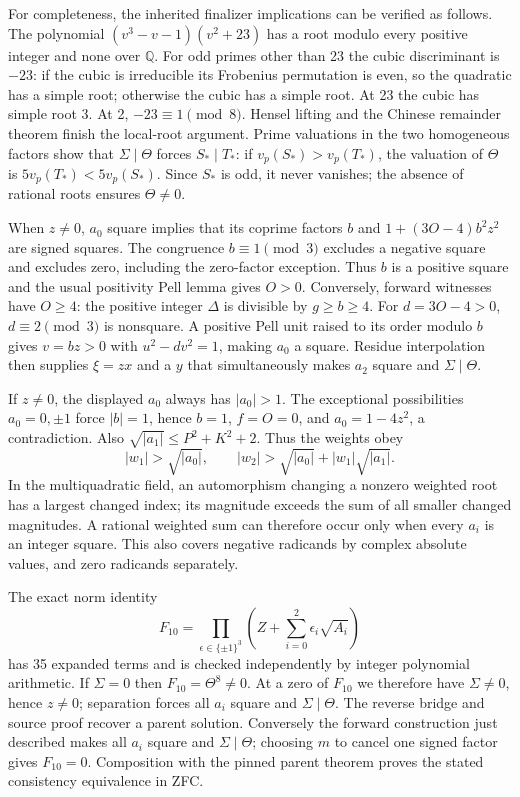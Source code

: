 For completeness, the inherited finalizer implications can be verified
as follows. The polynomial $(v^3-v-1)(v^2+23)$ has a root modulo every
positive integer and none over $\mathbb Q$. For odd primes other than
23 the cubic discriminant is $-23$: if the cubic is irreducible its
Frobenius permutation is even, so the quadratic has a simple root;
otherwise the cubic has a simple root. At 23 the cubic has simple root
3. At 2, $-23\equiv1\pmod8$. Hensel lifting and the Chinese remainder
theorem finish the local-root argument. Prime valuations in the two
homogeneous factors show that $\Sigma\mid\Theta$ forces $S_*\mid T_*$:
if $v_p(S_*)>v_p(T_*)$, the valuation of $\Theta$ is
$5v_p(T_*)<5v_p(S_*)$. Since $S_*$ is odd, it never vanishes; the absence
of rational roots ensures $\Theta\ne0$.

When $z\ne0$, $a_0$ square implies that its coprime factors $b$ and
$1+(3O-4)b^2z^2$ are signed squares. The congruence $b\equiv1\pmod3$
excludes a negative square and excludes zero, including the zero-factor
exception. Thus $b$ is a positive square and the usual positivity Pell
lemma gives $O>0$. Conversely, forward witnesses have $O\ge4$: the
positive integer $\Delta$ is divisible by $g\ge b\ge4$. For
$d=3O-4>0$, $d\equiv2\pmod3$ is nonsquare. A positive Pell unit raised
to its order modulo $b$ gives $v=bz>0$ with $u^2-dv^2=1$, making $a_0$
a square. Residue interpolation then supplies $\xi=zx$ and a $y$ that
simultaneously makes $a_2$ square and $\Sigma\mid\Theta$.

If $z\ne0$, the displayed $a_0$ always has $|a_0|>1$. The exceptional
possibilities $a_0=0,\pm1$ force $|b|=1$, hence $b=1$, $f=O=0$, and
$a_0=1-4z^2$, a contradiction. Also
$\sqrt{|a_1|}\le P^2+K^2+2$. Thus the weights obey
\[
 |w_1|>\sqrt{|a_0|},\qquad
 |w_2|>\sqrt{|a_0|}+|w_1|\sqrt{|a_1|}.
\]
In the multiquadratic field, an automorphism changing a nonzero weighted
root has a largest changed index; its magnitude exceeds the sum of all
smaller changed magnitudes. A rational weighted sum can therefore occur
only when every $a_i$ is an integer square. This also covers negative
radicands by complex absolute values, and zero radicands separately.

The exact norm identity
\[
 F_{10}=\prod_{\epsilon\in\{\pm1\}^3}
 \left(Z+\sum_{i=0}^2\epsilon_i\sqrt{A_i}\right)
\]
has 35 expanded terms and is checked independently by integer polynomial
arithmetic. If $\Sigma=0$ then $F_{10}=\Theta^8\ne0$. At a zero of
$F_{10}$ we therefore have $\Sigma\ne0$, hence $z\ne0$; separation forces
all $a_i$ square and $\Sigma\mid\Theta$. The reverse bridge and source
proof recover a parent solution. Conversely the forward construction
just described makes all $a_i$ square and $\Sigma\mid\Theta$; choosing
$m$ to cancel one signed factor gives $F_{10}=0$. Composition with the
pinned parent theorem proves the stated consistency equivalence in ZFC.

